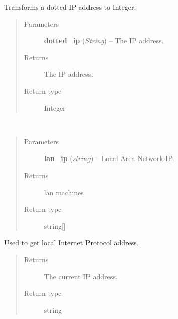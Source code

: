 \documentclass[letterpaper,10pt,english]{sphinxmanual}
\begin{document}
\begin{fulllineitems}
\label{api:utils.DottedIPToInt}
Transforms a dotted IP address to Integer.
\begin{quote}\begin{description}
\item[{Parameters}] \leavevmode
\textbf{dotted\_ip} (\emph{String}) -- The IP address.

\item[{Returns}] \leavevmode
The IP address.

\item[{Return type}] \leavevmode
Integer

\end{description}\end{quote}

\end{fulllineitems}


\begin{fulllineitems}
\label{api:utils.GetLANMachines}~\begin{quote}\begin{description}
\item[{Parameters}] \leavevmode
\textbf{lan\_ip} (\emph{string}) -- Local Area Network IP.

\item[{Returns}] \leavevmode
lan machines

\item[{Return type}] \leavevmode
string{[}{]}

\end{description}\end{quote}

\end{fulllineitems}


\begin{fulllineitems}
\label{api:utils.GetLocalIPAddress}
Used to get local Internet Protocol address.
\begin{quote}\begin{description}
\item[{Returns}] \leavevmode
The current IP address.

\item[{Return type}] \leavevmode
string

\end{description}\end{quote}

\end{fulllineitems}
\end{document}
